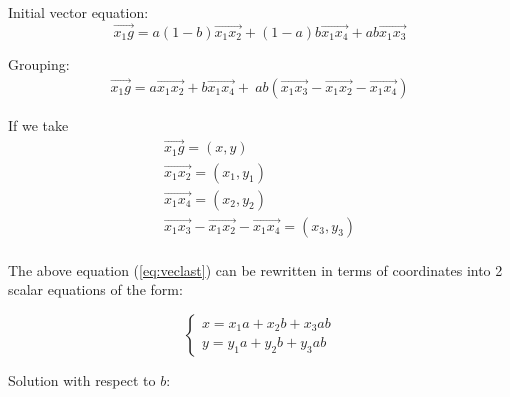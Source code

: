 \documentclass{article}
\begin{document}
    
\begin{landscape}

    Initial vector equation: 
    \begin{equation}
        \overrightarrow{x_1g} = a(1-b) \overrightarrow{x_1x_2} + (1-a)b\overrightarrow{x_1x_4} + ab \overrightarrow{x_1 x_3}
    \end{equation}

    Grouping: 
    \begin{equation}
        \label{eq:veclast}
        \begin{split}
            \overrightarrow{x_1g} = a \overrightarrow{x_1x_2} + b \overrightarrow{x_1x_4} + \
                                    ab \left(\overrightarrow{x_1 x_3} - \overrightarrow{x_1x_2} - \overrightarrow{x_1x_4}\right)
        \end{split}
    \end{equation}

    If we take
    \begin{equation}
        \begin{aligned}
            \overrightarrow{x_1g} = \left(x, y\right)  \\
            \overrightarrow{x_1x_2} = \left(x_1, y_1\right)  \\
            \overrightarrow{x_1x_4} = \left(x_2, y_2\right)  \\
            \overrightarrow{x_1x_3} - \overrightarrow{x_1x_2} - \overrightarrow{x_1x_4} = \left(x_3, y_3\right)  \\
        \end{aligned}
    \end{equation}

    The above equation (\ref{eq:veclast}) can be rewritten in terms of coordinates into 2 scalar equations of the form:

    \begin{equation}
        \label{systemtosolve}
        \left\{
        \begin{aligned}
             x = x_1 a + x_2 b + x_3 a b \\ 
             y = y_1 a + y_2 b + y_3 a b
        \end{aligned}
        \right.
    \end{equation}
    
    Solution with respect to $b$:


\end{landscape}
\end{document}
